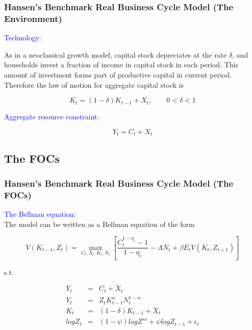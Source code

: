 \documentclass[handout]{beamer}
\begin{document}
\begin{frame}

\frametitle{Hansen's Benchmark Real Business Cycle Model (The
Environment)} \vskip 0.1in

\textcolor{blue}{Technology:}

As in a neoclassical growth model, capital stock depreciates at the
rate $\delta$, and households invest a fraction of income in capital
stock in each period. This amount of investment forms part of
productive capital in current period. Therefore the law of motion
for aggregate capital stock is

\begin{equation}\label{Eq3.4}
K_t=(1-\delta)K_{t-1} + X_t,\qquad 0<\delta<1
\end{equation}

\pause

\textcolor{blue}{Aggregate resource constraint:}

\begin{equation}\label{Eq3.5}
Y_t =C_t+X_t
\end{equation}

\end{frame}

\subsection{The FOCs}

\begin{frame}

\frametitle{Hansen's Benchmark Real Business Cycle Model (The FOCs)}
\vskip 0.1in

\textcolor{blue}{The Bellman equation:}\\
The model can be written as a Bellman equation of the form

\begin{equation}\label{Eq3.6}
V(K_{t-1},Z_{t}) = \max_{C_t, X_t, K_t, N_t}
[\frac{C_t^{1-\eta_{c}}-1}{1-\eta_{c}}-AN_{t} + \beta
E_{t}V(K_{t},Z_{t+1})]
\end{equation}

s.t.

\begin{eqnarray*}
Y_t &=& C_t+X_t\\
Y_t &=& Z_tK_{t-1}^{\alpha}N_t^{1-\alpha}\\
K_t &=& (1-\delta)K_{t-1} + X_t\\
logZ_t &=& (1-\psi)logZ^{ss} + \psi logZ_{t-1}+\epsilon_t
\end{eqnarray*}

\end{frame}
\end{document}
